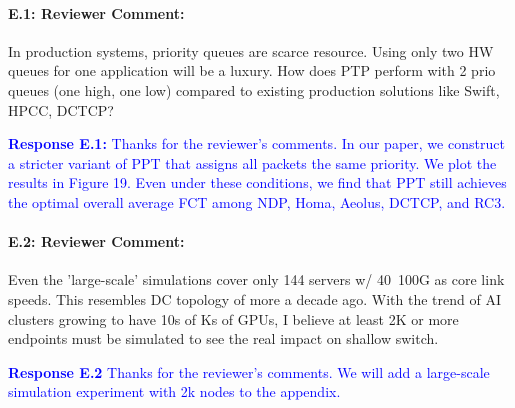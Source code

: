 \documentclass[12pt,one-column]{article}
\begin{document}
{\it \paragraph{E.1: Reviewer Comment:} In production systems, priority queues are scarce resource. Using only two HW queues for one application will be a luxury. How does PTP perform with 2 prio queues (one high, one low) compared to existing production solutions like Swift, HPCC, DCTCP?}

\noindent\textcolor{blue}{\textbf{Response E.1:}
Thanks for the reviewer’s comments. 
In our paper, we construct a stricter variant of PPT that assigns all packets the same priority.
We plot the results in Figure 19.
Even under these conditions, we find that PPT still achieves the optimal overall average FCT among NDP, Homa, Aeolus, DCTCP, and RC3.
}

{\it \paragraph{E.2: Reviewer Comment:} Even the 'large-scale' simulations cover only 144 servers w/ 40~100G as core link speeds. This resembles DC topology of more a decade ago. With the trend of AI clusters growing to have 10s of Ks of GPUs, I believe at least 2K or more endpoints must be simulated to see the real impact on shallow switch.}

\noindent\textcolor{blue}{\textbf{Response E.2}
Thanks for the reviewer’s comments. 
We will add a large-scale simulation experiment with 2k nodes to the appendix.
} 

\begin{spacing}{-1.0}

\vspace{-0.1in}

\end{spacing}
\end{document}
